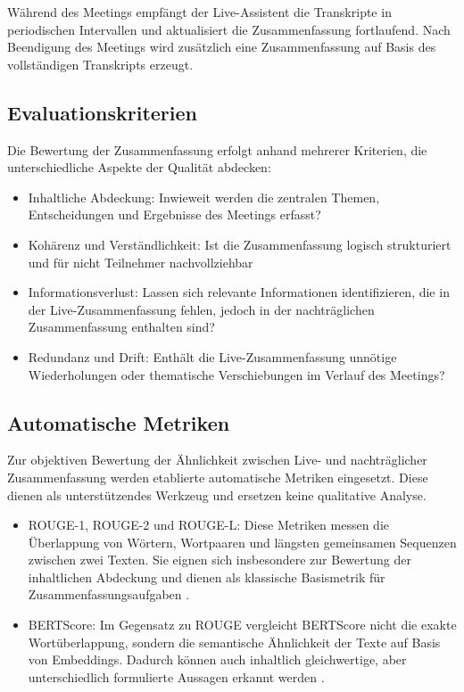 Während des Meetings empfängt der Live-Assistent die Transkripte in periodischen Intervallen und aktualisiert die Zusammenfassung fortlaufend. Nach Beendigung des Meetings wird zusätzlich eine Zusammenfassung auf Basis des vollständigen Transkripts erzeugt. 

\subsection{Evaluationskriterien}
Die Bewertung der Zusammenfassung erfolgt anhand mehrerer Kriterien, die unterschiedliche Aspekte der Qualität abdecken: 
\begin{itemize}
    \item Inhaltliche Abdeckung: Inwieweit werden die zentralen Themen, Entscheidungen und Ergebnisse des Meetings erfasst?
    \item Kohärenz und Verständlichkeit: Ist die Zusammenfassung logisch strukturiert und für nicht Teilnehmer nachvollziehbar 
    \item Informationsverlust: Lassen sich relevante Informationen identifizieren, die in der Live-Zusammenfassung fehlen, jedoch in der nachträglichen Zusammenfassung enthalten sind?
    \item Redundanz und Drift: Enthält die Live-Zusammenfassung unnötige Wiederholungen oder thematische Verschiebungen im Verlauf des Meetings?
\end{itemize}

\subsection{Automatische Metriken}
\label{KPI}
Zur objektiven Bewertung der Ähnlichkeit zwischen Live- und nachträglicher Zusammenfassung werden etablierte automatische Metriken eingesetzt. Diese dienen als unterstützendes Werkzeug und ersetzen keine qualitative Analyse.

\begin{itemize}
    \item ROUGE-1, ROUGE-2 und ROUGE-L: Diese Metriken messen die Überlappung von Wörtern, Wortpaaren und längsten gemeinsamen Sequenzen zwischen zwei Texten. Sie eignen sich insbesondere zur Bewertung der inhaltlichen Abdeckung und dienen als klassische Basismetrik für Zusammenfassungsaufgaben \cite{lin-2004-rouge}.
    \item BERTScore: Im Gegensatz zu ROUGE vergleicht BERTScore nicht die exakte Wortüberlappung, sondern die semantische Ähnlichkeit der Texte auf Basis von Embeddings. Dadurch können auch inhaltlich gleichwertige, aber unterschiedlich formulierte Aussagen erkannt werden \cite{Zhang2019}.
\end{itemize}

